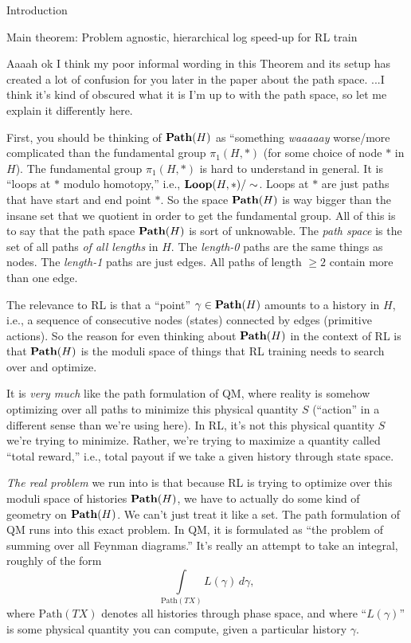 \documentclass[11pt]{article}
\begin{document}
\begin{section}{Introduction}
\begin{subsection}{Main theorem: Problem agnostic, hierarchical log speed-up for RL train}
{\color{blue} Aaaah ok I think my poor informal wording in this Theorem and its setup has created a lot of confusion for you later in the paper about the path space. ...I think it's kind of obscured what it is I'm up to with the path space, so let me explain it differently here.

First, you should be thinking of $\bold{Path}(H)$ as ``something {\em waaaaay} worse/more complicated than the fundamental group $\pi_{1}(H,\ast)$ (for some choice of node $\ast$ in $H$). The fundamental group $\pi_{1}(H,\ast)$ is hard to understand in general. It is ``loops at $\ast$ modulo homotopy,'' i.e., $\bold{Loop}(H, \ast)/\sim$. Loops at $\ast$ are just paths that have start and end point $\ast$. So the space $\bold{Path}(H)$ is way bigger than the insane set that we quotient in order to get the fundamental group. All of this is to say that the path space $\bold{Path}(H)$ is sort of unknowable. The {\em path space} is the set of all paths {\em of all lengths} in $H$. The {\em length-0} paths are the same things as nodes. The {\em length-1} paths are just edges. All paths of length $\ge 2$ contain more than one edge. 

The relevance to RL is that a ``point'' $\gamma\in\bold{Path}(H)$ amounts to a history in $H$, i.e., a sequence of consecutive nodes (states) connected by edges (primitive actions). So the reason for even thinking about $\bold{Path}(H)$ in the context of RL is that $\bold{Path}(H)$ is the moduli space of things that RL training needs to search over and optimize.

It is {\em very much} like the path formulation of QM, where reality is somehow optimizing over all paths to minimize this physical quantity $S$ (``action'' in a different sense than we're using here). In RL, it's not this physical quantity $S$ we're trying to minimize. Rather, we're trying to maximize a quantity called ``total reward,'' i.e., total payout if we take a given history through state space.

{\em The real problem} we run into is that because RL is trying to optimize over this moduli space of histories $\bold{Path}(H)$, we have to actually do some kind of geometry on $\bold{Path}(H)$. We can't just treat it like a set. The path formulation of QM runs into this exact problem. In QM, it is formulated as ``the problem of summing over all Feynman diagrams.'' It's really an attempt to take an integral, roughly of the form
$$
\underset{\text{Path}(TX)}{\int}\!\!\!\!\!\!L(\gamma)\,d\gamma,
$$
where $\text{Path}(TX)$ denotes all histories through phase space, and where ``$L(\gamma)$'' is some physical quantity you can compute, given a particular history $\gamma$. 

}
\end{subsection}
\end{section}
\end{document}

